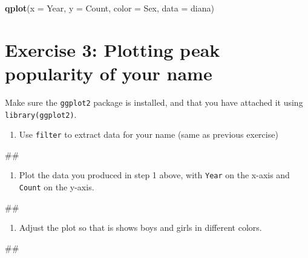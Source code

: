\documentclass[]{book}
\newenvironment{Shaded}{\begin{snugshade}}{\end{snugshade}}
\newcommand{\KeywordTok}[1]{\textcolor[rgb]{0.13,0.29,0.53}{\textbf{#1}}}
\newcommand{\DataTypeTok}[1]{\textcolor[rgb]{0.13,0.29,0.53}{#1}}
\newcommand{\NormalTok}[1]{#1}
\providecommand{\tightlist}{%
  \setlength{\itemsep}{0pt}\setlength{\parskip}{0pt}}
\begin{document}
\begin{Shaded}
\begin{Highlighting}[]
\KeywordTok{qplot}\NormalTok{(}\DataTypeTok{x =}\NormalTok{ Year, }\DataTypeTok{y =}\NormalTok{ Count, }\DataTypeTok{color =}\NormalTok{ Sex,}
      \DataTypeTok{data =}\NormalTok{ diana)}
\end{Highlighting}
\end{Shaded}

\section{Exercise 3: Plotting peak popularity of your
name}\label{exercise-3-plotting-peak-popularity-of-your-name}

Make sure the \texttt{ggplot2} package is installed, and that you have
attached it using \texttt{library(ggplot2)}.

\begin{enumerate}
\def\labelenumi{\arabic{enumi}.}
\tightlist
\item
  Use \texttt{filter} to extract data for your name (same as previous
  exercise)
\end{enumerate}

\begin{Shaded}
\begin{Highlighting}[]
\NormalTok{##}
\end{Highlighting}
\end{Shaded}

\begin{enumerate}
\def\labelenumi{\arabic{enumi}.}
\setcounter{enumi}{1}
\tightlist
\item
  Plot the data you produced in step 1 above, with \texttt{Year} on the
  x-axis and \texttt{Count} on the y-axis.
\end{enumerate}

\begin{Shaded}
\begin{Highlighting}[]
\NormalTok{##}
\end{Highlighting}
\end{Shaded}

\begin{enumerate}
\def\labelenumi{\arabic{enumi}.}
\setcounter{enumi}{2}
\tightlist
\item
  Adjust the plot so that is shows boys and girls in different colors.
\end{enumerate}

\begin{Shaded}
\begin{Highlighting}[]
\NormalTok{##}
\end{Highlighting}
\end{Shaded}
\end{document}
